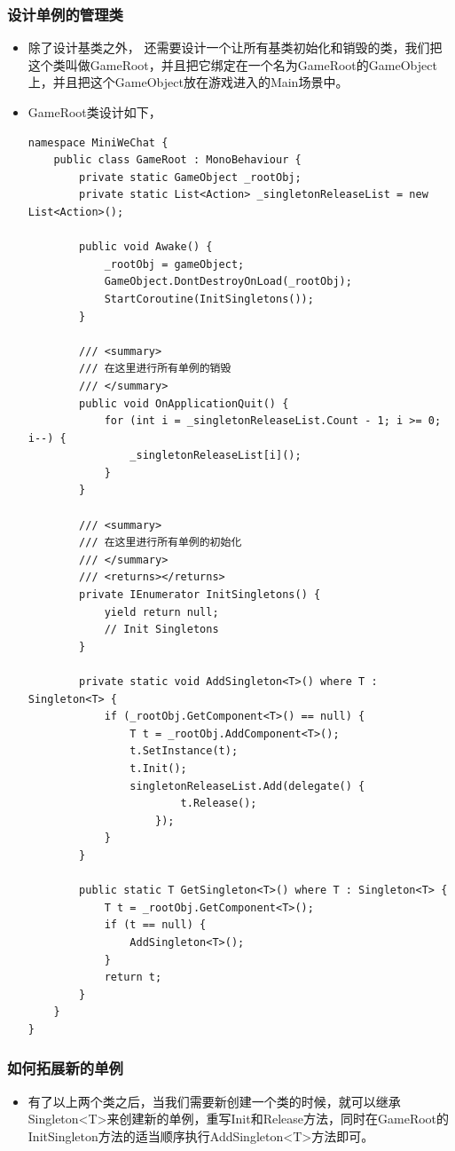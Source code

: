 \documentclass[9pt, b5paper]{article}
\begin{document}
\subsubsection{设计单例的管理类}
\label{sec:org03ee964}
\begin{itemize}
\item 除了设计基类之外， 还需要设计一个让所有基类初始化和销毁的类，我们把这个类叫做GameRoot，并且把它绑定在一个名为GameRoot的GameObject上，并且把这个GameObject放在游戏进入的Main场景中。
\item GameRoot类设计如下，
\begin{verbatim}
namespace MiniWeChat {
    public class GameRoot : MonoBehaviour {
        private static GameObject _rootObj;
        private static List<Action> _singletonReleaseList = new List<Action>();

        public void Awake() {        
            _rootObj = gameObject;
            GameObject.DontDestroyOnLoad(_rootObj);
            StartCoroutine(InitSingletons());
        }

        /// <summary>
        /// 在这里进行所有单例的销毁
        /// </summary>
        public void OnApplicationQuit() {        
            for (int i = _singletonReleaseList.Count - 1; i >= 0; i--) {            
                _singletonReleaseList[i]();
            }
        }

        /// <summary>
        /// 在这里进行所有单例的初始化
        /// </summary>
        /// <returns></returns>
        private IEnumerator InitSingletons() {        
            yield return null;
            // Init Singletons
        }

        private static void AddSingleton<T>() where T : Singleton<T> {        
            if (_rootObj.GetComponent<T>() == null) {            
                T t = _rootObj.AddComponent<T>();
                t.SetInstance(t);
                t.Init();
                singletonReleaseList.Add(delegate() {                
                        t.Release();
                    });
            }
        }

        public static T GetSingleton<T>() where T : Singleton<T> {        
            T t = _rootObj.GetComponent<T>();
            if (t == null) {            
                AddSingleton<T>();
            }
            return t;
        }
    }
}
\end{verbatim}
\end{itemize}
\subsubsection{如何拓展新的单例}
\label{sec:org12ddf7a}
\begin{itemize}
\item 有了以上两个类之后，当我们需要新创建一个类的时候，就可以继承Singleton<T>来创建新的单例，重写Init和Release方法，同时在GameRoot的InitSingleton方法的适当顺序执行AddSingleton<T>方法即可。
\end{itemize}
\end{document}
